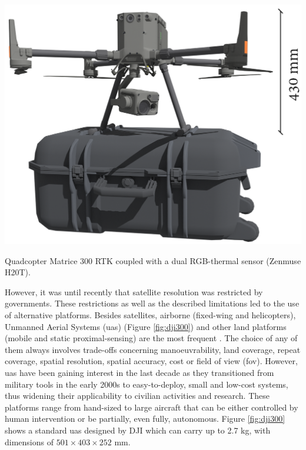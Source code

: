 \begin{marginfigure}[.7cm]
	\includegraphics{figs/introduction/dji300.png}
	\caption{Quadcopter Matrice 300 RTK coupled with a dual RGB-thermal sensor (Zenmuse H20T). }
	\label{fig:dji300}
\end{marginfigure}
However, it was until recently that satellite resolution was restricted by governments. These restrictions as well as the described limitations led to the use of alternative platforms. Besides satellites, airborne (fixed-wing and helicopters), Unmanned Aerial Systems (\acrshort{uas}) (Figure \ref{fig:dji300}) and other land platforms (mobile and static proximal-sensing) are the most frequent \cite{lillesand_remote_2015}. The choice of any of them always involves trade-offs concerning manoeuvrability, land coverage, repeat coverage, spatial resolution, spatial accuracy, cost or field of view (\acrshort{fov}). However, \acrshort{uas} have been gaining interest in the last decade as they transitioned from military tools in the early 2000s to easy-to-deploy, small and low-cost systems, thus widening their applicability to civilian activities and research. These platforms range from hand-sized to large aircraft that can be either controlled by human intervention or be partially, even fully, autonomous. Figure \ref{fig:dji300} shows a standard \acrshort{uas} designed by DJI which can carry up to 2.7 \si{\kilo\gram}, with dimensions of $501 \times 403 \times 252$ \si{\milli\meter}.

